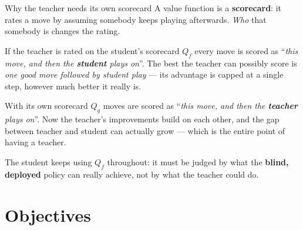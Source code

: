 \documentclass[aspectratio=169]{beamer}
\begin{document}
\begin{frame}{Why the teacher needs its own scorecard}
  \relax
  {\footnotesize A value function is a \textbf{scorecard}: it rates a move by assuming somebody
  keeps playing afterwards. \emph{Who} that somebody is changes the rating.}
  \vspace{0.5em}

  \begin{block}{\small If the teacher is rated on the student's scorecard $Q_f$}
    {\footnotesize every move is scored as ``\emph{this move, and then the \textbf{student} plays
    on}''. The best the teacher can possibly score is \emph{one good move followed by student
    play} --- its advantage is capped at a single step, however much better it really is.}
  \end{block}

  \begin{block}{\small With its own scorecard $Q_g$}
    {\footnotesize moves are scored as ``\emph{this move, and then the \textbf{teacher} plays
    on}''. Now the teacher's improvements build on each other, and the gap between teacher and
    student can actually grow --- which is the entire point of having a teacher.}
  \end{block}

  \vspace{0.2em}
  {\footnotesize The student keeps using $Q_f$ throughout: it must be judged by what the
  \textbf{blind, deployed} policy can really achieve, not by what the teacher could do.}
\end{frame}

\section{Objectives}
\end{document}
